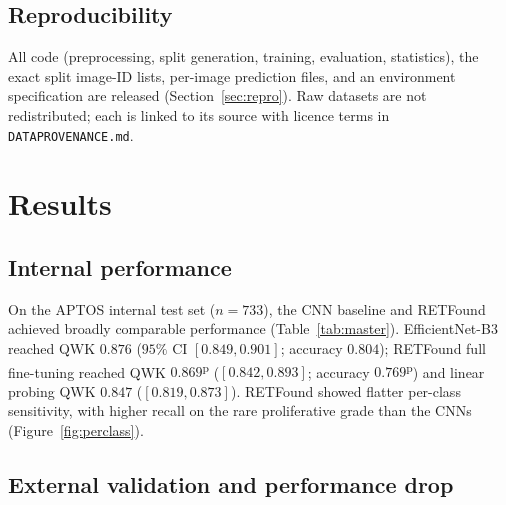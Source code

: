\documentclass[journal]{IEEEtran}
\newcommand{\pv}[1]{#1\textsuperscript{p}}
\renewcommand{\_}{\origunderscore\allowbreak}
\begin{document}
\subsection{Reproducibility}
\label{sec:methods-repro}

All code (preprocessing, split generation, training, evaluation, statistics), the
exact split image-ID lists, per-image prediction files, and an environment
specification are released (Section~\ref{sec:repro}). Raw datasets are not
redistributed; each is linked to its source with licence terms in
\texttt{DATA\_PROVENANCE.md}.


\section{Results}
\label{sec:results}

\subsection{Internal performance}
\label{sec:results-int}

On the APTOS internal test set ($n=733$), the CNN baseline and RETFound achieved
broadly comparable performance (Table~\ref{tab:master}). EfficientNet-B3 reached
QWK $0.876$ ($95\%$ CI $[0.849,0.901]$; accuracy $0.804$); RETFound full
fine-tuning reached QWK \pv{$0.869$} ($[0.842,0.893]$; accuracy \pv{$0.769$}) and
linear probing QWK $0.847$ ($[0.819,0.873]$). RETFound showed flatter per-class
sensitivity, with higher recall on the rare proliferative grade than the CNNs
(Figure~\ref{fig:perclass}).

\subsection{External validation and performance drop}
\label{sec:results-ext}
\end{document}

